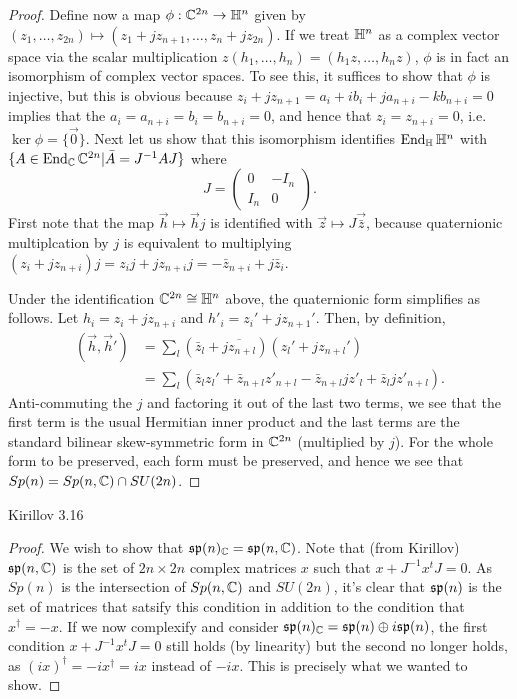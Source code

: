 \documentclass{../../mathnotes}
\begin{document}
\begin{proof}
    Define now a map $\phi:\mathbb{C}^{2n}\to\mathbb{H}^n$ given by $(z_1,\ldots, z_{2n})\mapsto(z_1+jz_{n+1},\ldots,z_n+jz_{2n})$. If we treat $\mathbb{H}^n$ as a complex vector
    space via the scalar multiplication $z(h_1,\ldots,h_n)=(h_1z,\ldots,h_nz)$, $\phi$ is in fact an isomorphism of complex vector spaces. To see this, it suffices
    to show that $\phi$ is injective, but this is obvious because $z_i+jz_{n+1}=a_i+ib_i+ja_{n+i}-kb_{n+i}=0$ implies that the $a_i=a_{n+i}=b_i=b_{n+i}=0$,
    and hence that $z_i=z_{n+i}=0$, i.e. $\ker\phi=\{\vec 0\}$. Next let us show that this isomorphism identifies $\operatorname{End}_{\mathbb{H}}\mathbb{H}^n$ with
    $\{A\in\operatorname{End}_{\mathbb{C}}\mathbb{C}^{2n} | \bar A=J^{-1}AJ\}$ where
    \[J=\begin{pmatrix}0&-I_n\\I_n&0\end{pmatrix}.\]
    First note that the map $\vec h\mapsto\vec hj$ is identified with $\vec z\mapsto J\vec{\bar z}$, because quaternionic multiplcation by $j$ is equivalent
    to multiplying $(z_i+jz_{n+i})j=z_ij+jz_{n+i}j=-\bar z_{n+i}+j\bar z_i$.

    Under the identification $\mathbb{C}^{2n}\cong\mathbb{H}^n$ above, the quaternionic form simplifies as follows. Let $h_i=z_i+jz_{n+i}$ and $h'_i=z_i'+jz_{n+1}'$.
    Then, by definition,
    \begin{align*}
        (\vec h,\vec h')&=\sum_l (\bar z_l+\overline{jz_{n+l}})(z_l'+jz_{n+l}')\\
        &=\sum_l\left( \bar z_lz_l'+\bar z_{n+l}z'_{n+l}-\bar z_{n+l}jz'_l+\bar z_l j z'_{n+l} \right).
    \end{align*}
    Anti-commuting the $j$ and factoring it out of the last two terms, we see that the first term is the usual Hermitian inner product and the last terms
    are the standard bilinear skew-symmetric form in $\mathbb{C}^{2n}$ (multiplied by $j$). For the whole form to be preserved, each form must be preserved, and hence
    we see that $Sp(n)=Sp(n,\mathbb{C})\cap SU(2n)$.
\end{proof}

\begin{prop}
    Kirillov 3.16
\end{prop}
\begin{proof}
    We wish to show that $\mathfrak{sp}(n)_{\mathbb{C}}=\mathfrak{sp}(n,\mathbb{C})$. Note that (from Kirillov) $\mathfrak{sp}(n,\mathbb{C})$ is the set of $2n\times 2n$ complex matrices $x$ such that $x+J^{-1}x^tJ=0$.
    As $Sp(n)$ is the intersection of $Sp(n,\mathbb{C})$ and $SU(2n)$, it's clear that $\mathfrak{sp}(n)$ is the set of matrices that satsify this condition in addition
    to the condition that $x^\dagger=-x$. If we now complexify and consider $\mathfrak{sp}(n)_{\mathbb{C}}=\mathfrak{sp}(n)\oplus i\mathfrak{sp}(n)$, the first condition $x+J^{-1}x^tJ=0$
    still holds (by linearity) but the second no longer holds, as $(ix)^\dagger=-ix^\dagger=ix$ instead of $-ix$. This is precisely what we wanted to show.
\end{proof}
\end{document}
